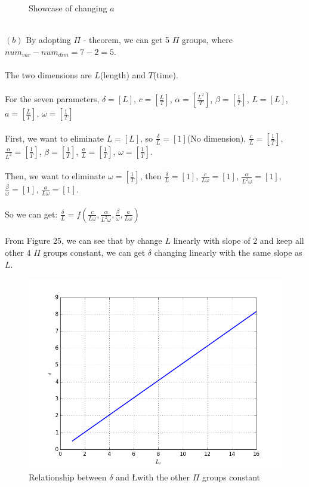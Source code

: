 \documentclass[12pt]{article}
\newenvironment{problem}[2][Problem]{\begin{trivlist}
\item[\hskip \labelsep {\bfseries #1}\hskip \labelsep {\bfseries #2.}]}{\end{trivlist}}
\begin{document}
\begin{problem}{3}
\begin{figure}[H]
 \caption{Showcase of changing $a$}
\label{label}
\end{figure}
\text{}\\
$(b)$ By adopting $\Pi$ - theorem, we can get 5 $\Pi$ groups, where $num_{var} - num_{dim} = 7 - 2 = 5.$\\
\\
The two dimensions are $L$(length) and $T$(time).\\
\\
For the seven parameters, $\delta = [L]$, $c = [\frac{L}{T}]$, $\alpha = [\frac{L^2}{T}]$, $\beta = [\frac{1}{T}]$, $L= [L]$, $a = [\frac{L}{T}]$, $\omega = [\frac{1}{T}]$\\
\\
First, we want to eliminate $L= [L]$, so $\frac{\delta}{L} = [1]$(No dimension),  $\frac{c}{L} = [\frac{1}{T}]$,  $\frac{\alpha}{L^2} =  [\frac{1}{T}]$, $\beta = [\frac{1}{T}]$, $\frac{a}{L} =  [\frac{1}{T}]$, $\omega = [\frac{1}{T}]$.\\
\\
Then, we want to eliminate $\omega = [\frac{1}{T}]$, then $\frac{\delta}{L} = [1]$, $\frac{c}{L\omega} = [1]$, $\frac{\alpha}{L^2 \omega} = [1]$, $\frac{\beta}{\omega} = [1]$, $\frac{a}{L\omega} = [1].$\\
\\
So we can get: $\frac{\delta}{L} = f(\frac{c}{L\omega}, \frac{\alpha}{L^2 \omega}, \frac{\beta}{\omega}, \frac{a}{L\omega})$\\
\\
From Figure 25, we can see that by change $L$ linearly with slope of 2 and keep all other 4 $\Pi$ groups constant, we can get $\delta$ changing linearly with the same slope as $L$.\\
\begin{figure}[H]
\centering
  \includegraphics[scale=0.65]{p3b.png}
 \caption{Relationship between $\delta$ and \L with the other $\Pi$ groups constant}
\label{label}
\end{figure}

\end{problem}
\end{document}
